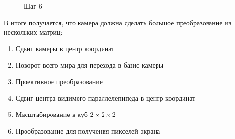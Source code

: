 \documentclass{article}
\begin{document}
\begin{center}
\begin{figure}[H]
\caption{Шаг 6}
\label{ris:image}
\end{figure}
\end{center}


В итоге получается, что камера должна сделать большое преобразование из нескольких матриц:

\begin{enumerate}
	\item Сдвиг камеры в центр координат
	\item Поворот всего мира для перехода в базис камеры
	\item Проективное преобразование
	\item Сдвиг центра видимого параллелепипеда в центр координат
	\item Масштабирование в куб $2 \times 2 \times 2$
	\item Прообразование для получения пикселей экрана
\end{enumerate}
\end{document}
